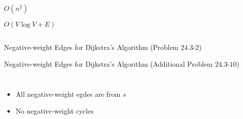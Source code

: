 
\begin{frame}{}
\end{frame}

\begin{frame}[fragile]
  \begin{columns}
      
  \end{columns}

  \pause
  \vspace{0.50cm}
  \begin{columns}
      \begin{description}
	\item[Array:] $O(n^2)$
	\item[Min-heap:] 
	\item[Fib-heap:] $O(V \log V + E)$
      \end{description}
  \end{columns}
\end{frame}

\begin{frame}{}
\end{frame}

\begin{frame}{}
  \begin{exampleblock}{Negative-weight Edges for Dijkstra's Algorithm (Problem $24.3$-$2$)}
  \end{exampleblock}
\end{frame}

\begin{frame}{}
  \begin{exampleblock}{Negative-weight Edges for Dijkstra's Algorithm (Additional Problem $24.3$-$10$)}
    \begin{columns}
	\begin{itemize}
	  \item All negative-weight egdes are from $s$
	  \item No negative-weight cycles
	\end{itemize}
    \end{columns}
  \end{exampleblock}

  \pause
\end{frame}

